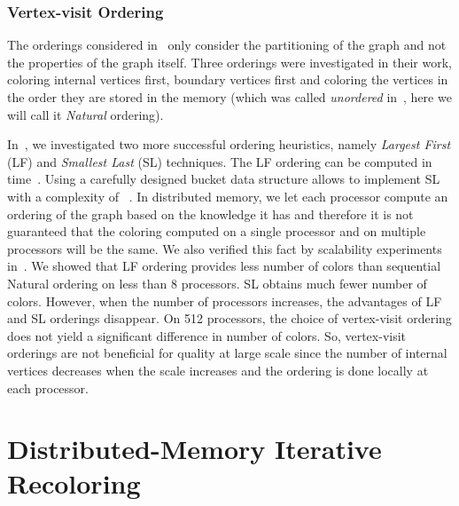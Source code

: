 \documentclass{article}
\begin{document}
\subsubsection{Vertex-visit Ordering}

The orderings considered in~\cite{BGMBC-jpdc} only consider the 
partitioning of the graph and not the properties of the graph
itself. Three orderings were investigated in their work, coloring
internal vertices first, boundary vertices first and coloring the
vertices in the order they are stored in the memory (which was called
{\em unordered} in~\cite{BGMBC-jpdc}, here we will call it {\em Natural} ordering).

In~\cite{HiPC11}, we investigated two more successful ordering heuristics,
namely {\em Largest First} (LF) and {\em Smallest Last} (SL)
techniques.  The LF ordering can be computed in  time~\cite{Welsh01011967}.
Using a carefully designed bucket data structure allows to implement SL with a
complexity of ~\cite{Matula1983}. In distributed memory, we let each
processor compute an ordering of the graph based on the knowledge it has and
therefore it is not guaranteed that the coloring computed on a single processor and on multiple
processors will be the same. We also verified this fact by scalability experiments
in~\cite{HiPC11}. We showed that LF ordering provides less number of colors than
sequential Natural ordering on less than 8 processors. SL obtains much fewer number
of colors. However, when the number of processors increases, the advantages of
LF and SL orderings disappear. On 512 processors, the choice of vertex-visit
ordering does not yield a significant difference in number of colors. So, vertex-visit orderings
are not beneficial for quality at large scale since the number of internal
vertices decreases when the scale increases and the ordering is done locally at each processor.



\section{Distributed-Memory Iterative Recoloring}
\label{sec:improv}
\end{document}

